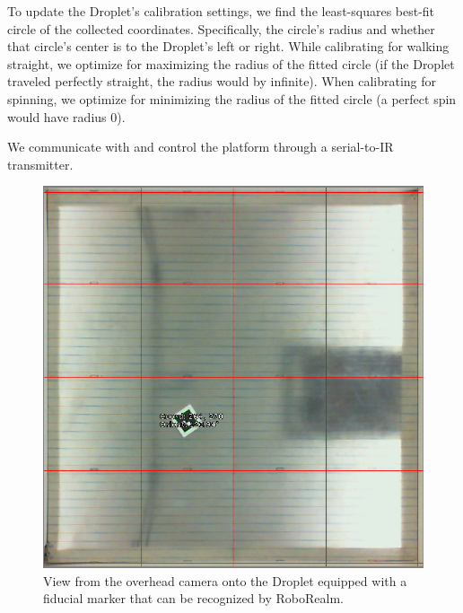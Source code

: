 \documentclass[letterpaper, 10pt, conference]{ieeeconf}
\begin{document}
To update the Droplet's calibration settings, we find the least-squares best-fit circle of the collected coordinates. Specifically, the circle's radius and whether that circle's center is to the Droplet's left or right. While calibrating for walking straight, we optimize for maximizing the radius of the fitted circle (if the Droplet traveled perfectly straight, the radius would by infinite). When calibrating for spinning, we optimize for minimizing the radius of the fitted circle (a perfect spin would have radius 0).

We communicate with and control the platform through a serial-to-IR transmitter. 

\begin{figure}[!htb]
\includegraphics[width=\linewidth]{images/cameraView}
\caption{View from the overhead camera onto the Droplet equipped with a fiducial marker that can be recognized by RoboRealm.\label{fig:expsetup}} 
\end{figure}
\end{document}
